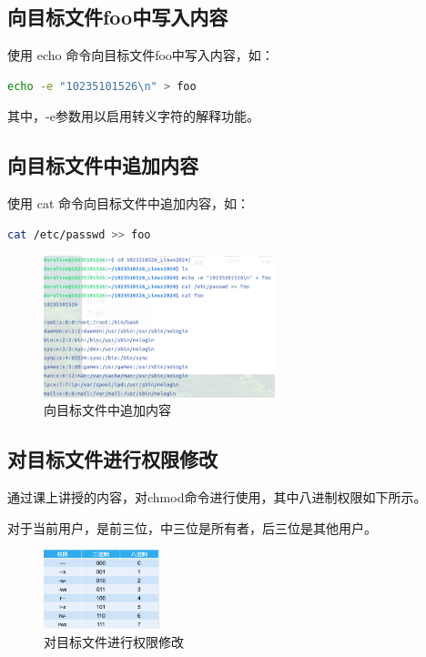 \documentclass[14pt,a4paper,UTF8,twoside]{article}
\begin{document}
\subsection{向目标文件foo中写入内容}
使用 echo 命令向目标文件foo中写入内容，如：

\begin{lstlisting}[language = bash, title = {向目标文件foo中写入内容}]
  echo -e "10235101526\n" > foo
\end{lstlisting}

其中，-e参数用以启用转义字符的解释功能。

\subsection{向目标文件中追加内容}
使用 cat 命令向目标文件中追加内容，如：

\begin{lstlisting}[language = bash, title = {向目标文件中追加内容}]
  cat /etc/passwd >> foo
\end{lstlisting}

\begin{figure}[H]
  \centering
    \includegraphics[width=0.6\textwidth]{lec2/cat.png}
    \caption{向目标文件中追加内容}
    \label{fig:2}
\end{figure}

\subsection{对目标文件进行权限修改}

通过课上讲授的内容，对chmod命令进行使用，其中八进制权限如下所示。

对于当前用户，是前三位，中三位是所有者，后三位是其他用户。

\begin{figure}[H]
  \centering
  \includegraphics[width=0.3\textwidth]{lec2/privilege.png}
  \caption{对目标文件进行权限修改}
  \label{fig:3}
\end{figure}
\end{document}
